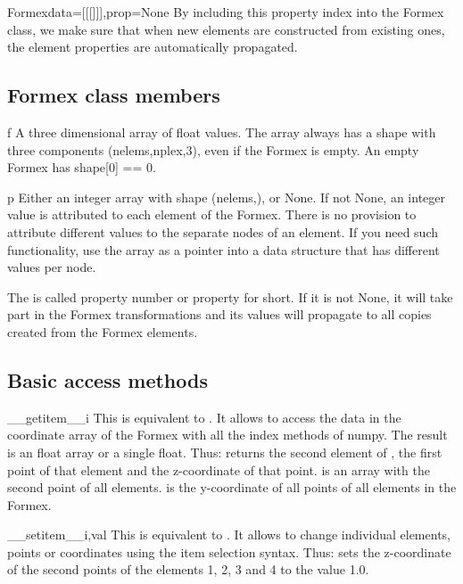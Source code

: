 {{\begin{classdesc}{Formex}{data=[[[]]],prop=None}
By including this property index into the Formex class, we make sure that when new elements are constructed from existing ones, the element properties are automatically propagated.

\end{classdesc}

\subsection{Formex class members}

\begin{memberdesc}  [array]{f}
A three dimensional array of float values. The array always has a shape with three components (nelems,nplex,3), even if the Formex is empty. An empty Formex has shape[0] == 0.
\end{memberdesc}

\begin{memberdesc}  [array]{p}
Either an integer array with shape (nelems,), or None. If not None, an integer value is attributed to each element of the Formex. There is no provision to attribute different values to the separate nodes of an element. If you need such functionality, use the  array as a pointer into a data structure that has different values per node.

The  is called property number or property for short. If it is not None, it will take part in the Formex transformations and its values will propagate to all copies created from the Formex elements.
\end{memberdesc}

\subsection{Basic access methods}

\begin{methoddesc}{__getitem__}{i}
This is equivalent to . It allows to access the data in the coordinate array  of the Formex with all the index methods of numpy. The result is an float array or a single float. Thus:  returns the second element of ,  the first point of that element and  the z-coordinate of that point.  is an array with the second point of all elements.  is the y-coordinate of all points of all elements in the Formex.
\end{methoddesc}

\begin{methoddesc}{__setitem__}{i,val}
This is equivalent to . It allows to change individual elements, points or coordinates using the item selection syntax. Thus:  sets the z-coordinate of the second points of the elements 1, 2, 3 and 4 to the value 1.0.
\end{methoddesc}

}}
